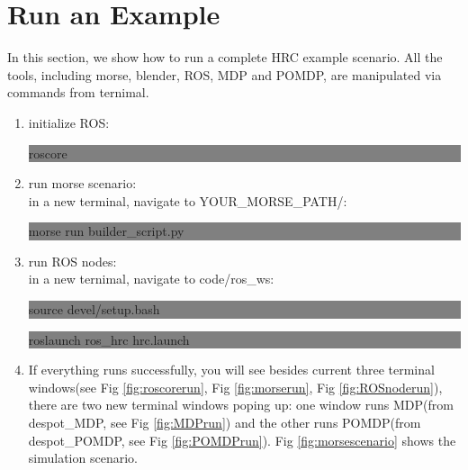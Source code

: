 \section{Run an Example}
In this section, we show how to run a complete HRC example scenario. All the tools, including morse, blender, ROS, MDP and POMDP, are manipulated via commands from ternimal.
\begin{enumerate}\setlength{\itemsep}{0.05cm}
	\item initialize ROS:\\
	\colorbox{gray}{\begin{minipage}{\linewidth} roscore \end{minipage}}
	\item run morse scenario:\\
	in a new terminal, navigate to YOUR\_MORSE\_PATH/:\\
	\colorbox{gray}{\begin{minipage}{\linewidth} morse run builder\_script.py \end{minipage}}
	\item run ROS nodes:\\
	in a new ternimal, navigate to code/ros\_ws:\\
	\colorbox{gray}{\begin{minipage}{\linewidth} source devel/setup.bash \end{minipage}}
	\colorbox{gray}{\begin{minipage}{\linewidth} roslaunch ros\_hrc hrc.launch \end{minipage}}
	\item If everything runs successfully, you will see besides current three terminal windows(see Fig \ref{fig:roscorerun}, Fig \ref{fig:morserun}, Fig \ref{fig:ROSnoderun}), there are two new terminal windows poping up: one window runs MDP(from despot\_MDP, see Fig \ref{fig:MDPrun}) and the other runs POMDP(from despot\_POMDP, see Fig \ref{fig:POMDPrun}). Fig \ref{fig:morsescenario} shows the simulation scenario.


\end{enumerate}
